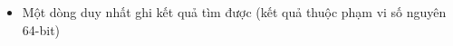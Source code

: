 \begin{itemize}
	\item     Một dòng duy nhất ghi kết quả tìm được (kết quả thuộc phạm vi số nguyên 64-bit)   
\end{itemize}

\